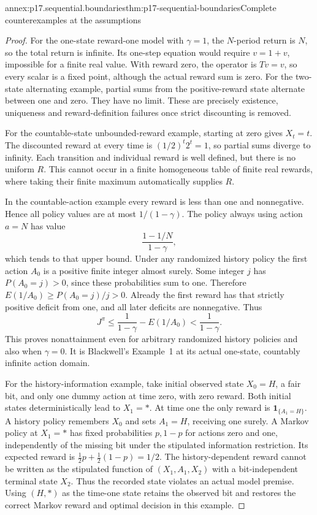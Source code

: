 \begin{annexitem}{annex:p17.sequential.boundaries}{thm:p17-sequential-boundaries}{Complete counterexamples at the assumptions}
\begin{proof}
For the one-state reward-one model with
\(\gamma=1\), the \(N\)-period return is \(N\),
so the total return is infinite. Its one-step
equation would require \(v=1+v\), impossible
for a finite real value. With reward zero,
the operator is \(Tv=v\), so every scalar is
a fixed point, although the actual reward
sum is zero. For the two-state alternating
example, partial sums from the positive-reward
state alternate between one and zero.
They have no limit. These are precisely
existence, uniqueness and reward-definition
failures once strict discounting is removed.

For the countable-state unbounded-reward
example, starting at zero gives \(X_t=t\).
The discounted reward at every time is
\((1/2)^t2^t=1\), so partial sums diverge
to infinity. Each transition and individual
reward is well defined, but there is no
uniform \(R\). This cannot occur in a
finite homogeneous table of finite real
rewards, where taking their finite maximum
automatically supplies \(R\).

In the countable-action example every
reward is less than one and nonnegative.
Hence all policy values are at most
\(1/(1-\gamma)\). The policy always using
action \(a=N\) has value
\[
                    \frac{1-1/N}{1-\gamma},
\]
which tends to that upper bound.
Under any randomized history policy the
first action \(A_0\) is a positive finite
integer almost surely. Some integer \(j\)
has \(P(A_0=j)>0\), since these probabilities
sum to one. Therefore
\(E(1/A_0)\geq P(A_0=j)/j>0\).
Already the first reward has that strictly
positive deficit from one, and all later
deficits are nonnegative. Thus
\[
                  J^\pi\leq\frac1{1-\gamma}-E(1/A_0)
                                      <\frac1{1-\gamma}.
\]
This proves nonattainment even for arbitrary
randomized history policies and also when
\(\gamma=0\). It is Blackwell's Example~1
at its actual one-state, countably infinite
action domain.

For the history-information example,
take initial observed state \(X_0=H\),
a fair bit, and only one dummy action
at time zero, with zero reward.
Both initial states deterministically
lead to \(X_1=*\). At time one the only
reward is \(\mathbf1_{\{A_1=H\}}\).
A history policy remembers \(X_0\) and
sets \(A_1=H\), receiving one surely.
A Markov policy at \(X_1=*\) has fixed
probabilities \(p,1-p\) for actions zero
and one, independently of the missing
bit under the stipulated information
restriction. Its expected reward is
\(\tfrac12p+\tfrac12(1-p)=1/2\).
The history-dependent reward cannot be
written as the stipulated function of
\((X_1,A_1,X_2)\) with a bit-independent
terminal state \(X_2\). Thus the recorded
state violates an actual model premise.
Using \((H,*)\) as the time-one state
retains the observed bit and restores
the correct Markov reward and optimal
decision in this example.


\end{proof}
\end{annexitem}
